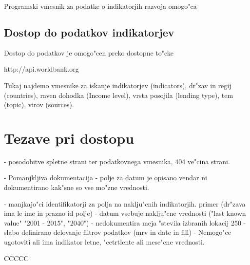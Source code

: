 Programski vmesnik za podatke o indikatorjih razvoja omogo"ca 


\subsection{Dostop do podatkov indikatorjev}

Dostop do podatkov je omogo"cen preko dostopne to"cke

http://api.worldbank.org

Tukaj najdemo vmesnike za iskanje indikatorjev (indicators), dr"zav in regij
(countries), raven dohodka (Income level), vrsta posojila (lending type), tem
(topic), virov (sources).





\section{Tezave pri dostopu}

- posodobitve spletne strani ter podatkovnega vmesnika, 404 ve"cina strani.

- Pomanjkljiva dokumentacija
    - polje za datum je opisano vendar ni dokumentirano kak"sne so vse mo"zne
      vrednosti. 

- manjkajo"ci identifikatorji za polja na naklju"cnih indikatorjih.
  primer (dr"zava ima le ime in prazno id polje)
- datum vsebuje naklju"cne vrednosti ("last known value" "2001 - 2015", "2040")
- nedokumentira meja "stevila izbranih lokacij 250
- slabo definirano delovanje filtrov podatkov (mrv in date in fill)
- Nemogo"ce ugotoviti ali ima indikator letne, "cetrtlente ali mese"cne vrednosti.



CCCCC
